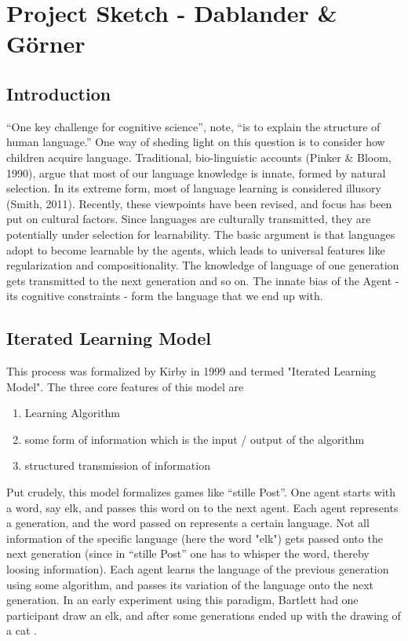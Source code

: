 \documentclass[12pt]{scrartcl}
\begin{document}
\section*{Project Sketch - Dablander \& Görner}

\subsection*{Introduction}
``One key challenge for cognitive science'', \textcite[p. 5241]{kirby2007innateness} note, ``is to explain
the structure of human language.'' One way of sheding light on this question is to consider
how children acquire language. Traditional, bio-linguistic accounts (Pinker \& Bloom, 1990),
argue that most of our language knowledge is innate, formed by natural selection. In its extreme form, most of language learning is considered illusory (Smith, 2011). Recently, these viewpoints have been revised, and focus has been put on cultural factors. Since
languages are culturally transmitted, they are potentially under selection for learnability.
The basic argument is that languages adopt to become learnable by the agents, which leads to
universal features like regularization and compositionality. The knowledge of language of one
generation gets transmitted to the next generation and so on. The innate bias of the Agent - its
cognitive constraints - form the language that we end up with.

\subsection*{Iterated Learning Model}

This process was formalized by Kirby in 1999 and termed "Iterated Learning Model". The
three core features of this model \parencite{ferdinand2008language} are

\begin{enumerate}
  \item Learning Algorithm
  \item some form of information which is the input / output of the algorithm
  \item structured transmission of information
\end{enumerate}

Put crudely, this model formalizes games like ``stille Post''. One agent starts with
a word, say elk, and passes this word on to the next agent. Each agent represents
a generation, and the word passed on represents a certain language. Not all information of
the specific language (here the word "elk") gets passed onto the next generation (since in
``stille Post'' one has to whisper the word, thereby loosing information). Each agent
learns the language of the previous generation using some algorithm, and passes its variation
of the language onto the next generation. In an early experiment using this paradigm, Bartlett
had one participant draw an elk, and after some generations ended up with the drawing of a cat \parencite{bartlett1932remembering}.
\end{document}
